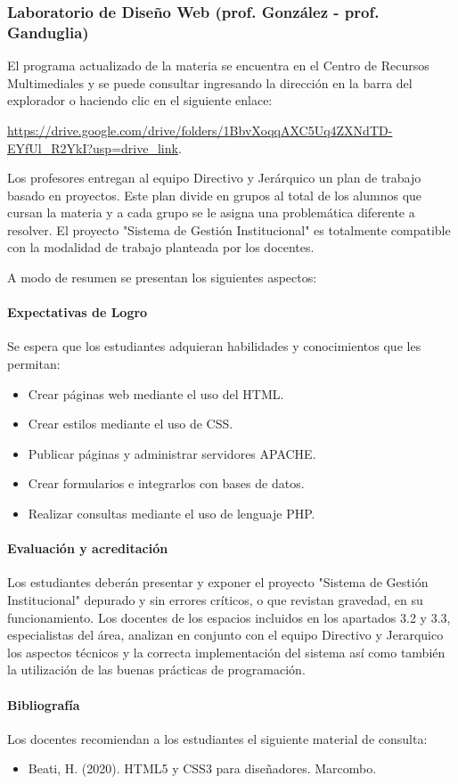 \subsubsection{Laboratorio de Diseño Web (prof. González - prof. Ganduglia)}
El programa actualizado de la materia se encuentra en el Centro de Recursos Multimediales y se puede consultar ingresando la dirección en la barra del explorador o haciendo clic en el siguiente enlace:

\url{https://drive.google.com/drive/folders/1BbvXoqqAXC5Uq4ZXNdTD-EYfUl_R2YkI?usp=drive_link}.

Los profesores entregan al equipo Directivo y Jerárquico un plan de trabajo basado en proyectos. Este plan divide en grupos al total de los alumnos que cursan la materia y a cada grupo se le asigna una problemática diferente a resolver. El proyecto "Sistema de Gestión Institucional" es totalmente compatible con la modalidad de trabajo planteada por los docentes.

A modo de resumen se presentan los siguientes aspectos:
\paragraph{Expectativas de Logro}
Se espera que los estudiantes adquieran habilidades y conocimientos que les permitan: 

\begin{itemize}
    \item Crear páginas web mediante el uso del HTML.
    \item Crear estilos mediante el uso de CSS.
    \item Publicar páginas y administrar servidores APACHE.
    \item Crear formularios e integrarlos con bases de datos.
    \item Realizar consultas mediante el uso de lenguaje PHP.

\end{itemize}

\paragraph{Evaluación y acreditación}

Los estudiantes deberán presentar y exponer el proyecto "Sistema de Gestión Institucional" depurado y sin errores críticos, o que revistan gravedad, en su funcionamiento. Los docentes de los espacios incluidos en los apartados 3.2 y 3.3, especialistas del área, analizan en conjunto con el equipo Directivo y Jerarquico los aspectos técnicos y la correcta implementación del sistema así como también la utilización de las buenas prácticas de programación.

\paragraph{Bibliografía} Los docentes recomiendan a los estudiantes el siguiente material de consulta:

\begin{itemize}
    \item Beati, H. (2020). HTML5 y CSS3 para diseñadores. Marcombo.
\end{itemize}
